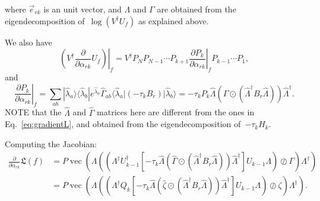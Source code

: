 \documentclass[aps,pra,12pt,showpacs,showkeys,nofootinbib,superscriptaddress,longbibliography]{revtex4}
\newcommand{\bra}[1]{\mbox{$\langle #1|$}}
\newcommand{\ket}[1]{\mbox{$|#1\rangle$}}
\newcommand{\ketbra}[2]{\mbox{$|#1\rangle\langle #2|$}}
\DeclareMathOperator{\VEC}{vec}
\newcommand{\mf}[1]{\mathfrak{#1}}
\newcommand{\pde}[2]{\frac{\partial #1}{\partial #2}}
\newcommand{\be}{\begin{equation}}
\newcommand{\ee}{\end{equation}}
\begin{document}
where $\vec{e}_{rk}$ is an unit vector, and $\Lambda$ and $\Gamma$ are obtained from the eigendecomposition
of~$\log(V^\dagger U_f)$ as explained above.

We also have
\be
\left. \left( V^\dagger \pde{}{\alpha_{rk}} U_f \right)\right|_{f}
=
V^\dagger P_N P_{N-1} \cdots P_{k+1} \left. \pde{P_k}{\alpha_{rk}}
\right|_{f} P_{k-1} \cdots P_1,
\ee
and
\be
\left. \pde{P_k}{\alpha_{rk}} \right|_{f}
=
\sum_{ab} \ketbra{\hat{\lambda}_a}{\hat{\lambda}_b}  e^{\hat{\lambda}_a} \hat{\Gamma}_{ab} \bra{\hat{\lambda}_a} (-\tau_k B_r) \ket{\hat{\lambda}_b}
=
-\tau_k P_k \hat{\Lambda} \left(\hat{\Gamma} \odot
(\hat{\Lambda}^\dagger B_r \hat{\Lambda}) \right) \hat{\Lambda}^\dagger.
\ee
NOTE that the $\hat{\Lambda}$ and $\hat{\Gamma}$ matrices here are different from
the ones in Eq.~\eqref{eq:gradientL}, and obtained from the
eigendecomposition of~$-\tau_k H_k$.


Computing the Jacobian:
\begin{align*}
\pde{}{\alpha_{rk}} \mf{L}(f)
&= P \VEC \left( 
\Lambda \left( \left(\Lambda^\dagger
U_{k-1}^\dagger \left[
-\tau_k \hat{\Lambda} \left(\hat{\Gamma} \odot
(\hat{\Lambda}^\dagger B_r \hat{\Lambda}) \right) \hat{\Lambda}^\dagger
\right] U_{k-1}
\Lambda \right) \oslash \Gamma \right) \Lambda^\dagger
\right)\\
&= P \VEC \left( 
\Lambda \left( \left(\Lambda^\dagger
Q_{k}
\left[
-\tau_k \hat{\Lambda} \left(\hat{\zeta} \odot
(\hat{\Lambda}^\dagger B_r \hat{\Lambda}) \right)
\hat{\Lambda}^\dagger
\right]
U_{k-1}
\Lambda \right) \oslash \zeta \right) \Lambda^\dagger
\right).
\end{align*}


\end{document}
